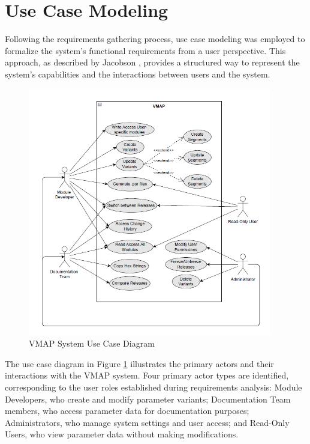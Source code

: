 \section{Use Case Modeling}
\label{sec:use-case-modeling}

Following the requirements gathering process, use case modeling was employed to formalize the system's functional requirements from a user perspective. This approach, as described by Jacobson \cite{jacobson2004use}, provides a structured way to represent the system's capabilities and the interactions between users and the system.

\begin{figure}[h]
    \centering
    \includegraphics[width=0.95\textwidth]{figures/vmap_use_case_diagram.png}
    \caption{\ac{VMAP} System Use Case Diagram}
    \label{fig:use-case-diagram}
\end{figure}

The use case diagram in Figure \ref{fig:use-case-diagram} illustrates the primary actors and their interactions with the \ac{VMAP} system. Four primary actor types are identified, corresponding to the user roles established during requirements analysis: Module Developers, who create and modify parameter variants; Documentation Team members, who access parameter data for documentation purposes; Administrators, who manage system settings and user access; and Read-Only Users, who view parameter data without making modifications.

